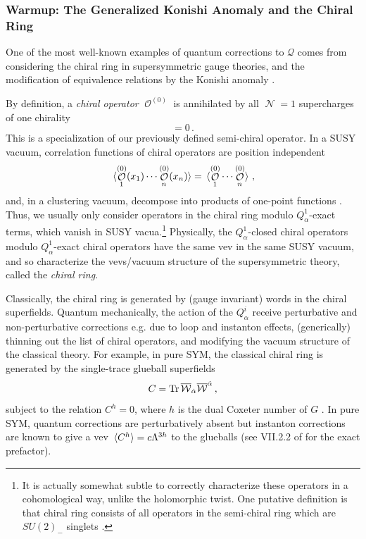 \documentclass[11pt]{article}
\DeclareMathOperator{\calN}{\mathcal{N}}
\DeclareMathOperator{\calO}{\mathcal{O}}
\renewcommand{\bm}{\mathcal}
\begin{document}
\subsubsection{Warmup: The Generalized Konishi Anomaly and the Chiral Ring}
One of the most well-known examples of quantum corrections to $\bm{Q}$ comes from considering the chiral ring in supersymmetric gauge theories, and the modification of equivalence relations by the Konishi anomaly \cite{Konishi:1983hf, Konishi:1985tu, CDSW}. 

By definition, a \textit{chiral operator} $\calO^{(0)}$ is annihilated by all $\calN=1$ supercharges of one chirality
\begin{equation}
    [Q_{\alpha}^1,\calO^{(0)}] = 0\,.
\end{equation}
This is a specialization of our previously defined semi-chiral operator. In a SUSY vacuum, correlation functions of chiral operators are position independent
\begin{equation}
    \expval*{\calO_1^{(0)}(x_1) \cdots \calO_n^{(0)}(x_n)} = \expval*{\calO_1^{(0)} \cdots \calO_n^{(0)}}\,,
\end{equation}
and, in a clustering vacuum, decompose into products of one-point functions \cite{Novikov:1983ee, CDSW, Hori:2003ic}. Thus, we usually only consider operators in the chiral ring modulo $Q_{\alpha}^1$-exact terms, which vanish in SUSY vacua.\footnote{It is actually somewhat subtle to correctly characterize these operators in a cohomological way, unlike the holomorphic twist. One putative definition is that chiral ring consists of all operators in the semi-chiral ring which are $SU(2)_-$ singlets \cite{Budzik:2023xbr}.} Physically, the $Q_{\alpha}^1$-closed chiral operators modulo $Q_{\alpha}^1$-exact chiral operators have the same vev in the same SUSY vacuum, and so characterize the vevs/vacuum structure of the supersymmetric theory, called the \textit{chiral ring}.

Classically, the chiral ring is generated by (gauge invariant) words in the chiral superfields. Quantum mechanically, the action of the $Q^i_{\alpha}$ receive perturbative and non-perturbative corrections e.g. due to loop and instanton effects, (generically) thinning out the list of chiral operators, and modifying the vacuum structure of the classical theory. For example, in pure SYM, the classical chiral ring is generated by the single-trace glueball superfields
\begin{equation}
    C = \Tr \overline{\mathcal{W}}_{\dot\alpha} \overline{\mathcal{W}}^{\dot\alpha}\,,
\end{equation}
subject to the relation $C^h = 0$, where $h$ is the dual Coxeter number of $G$ \cite{CDSW, Witten:2003ye, Etingof:2003dd, Cederwall:2023lev}. In pure SYM, quantum corrections are perturbatively absent but instanton corrections are known to give a vev $\expval*{C^h} = c \Lambda^{3h}$ to the glueballs \cite{Novikov:1983ee, CDSW} (see VII.2.2 of \cite{Dorey:2002ik} for the exact prefactor).
\end{document}
